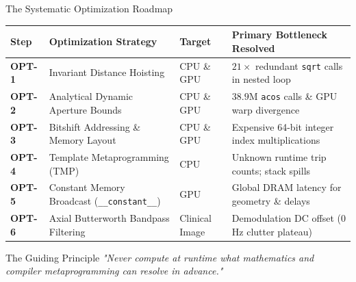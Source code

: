 \documentclass[aspectratio=169,10pt]{beamer}
\begin{document}
\begin{frame}{The Systematic Optimization Roadmap}
  \begin{table}
    \centering
    \tiny
    \begin{tabular}{@{}llll@{}}
      \toprule
      \textbf{Step} & \textbf{Optimization Strategy} & \textbf{Target} & \textbf{Primary Bottleneck Resolved} \\
      \midrule
      \textbf{OPT-1} & Invariant Distance Hoisting & CPU \& GPU & $21\times$ redundant \texttt{sqrt} calls in nested loop \\
      \textbf{OPT-2} & Analytical Dynamic Aperture Bounds & CPU \& GPU & $38.9\text{M}$ \texttt{acos} calls \& GPU warp divergence \\
      \textbf{OPT-3} & Bitshift Addressing \& Memory Layout & CPU \& GPU & Expensive 64-bit integer index multiplications \\
      \textbf{OPT-4} & Template Metaprogramming (TMP) & CPU & Unknown runtime trip counts; stack spills \\
      \textbf{OPT-5} & Constant Memory Broadcast (\texttt{\_\_constant\_\_}) & GPU & Global DRAM latency for geometry \& delays \\
      \textbf{OPT-6} & Axial Butterworth Bandpass Filtering & Clinical Image & Demodulation DC offset ($0$ Hz clutter plateau) \\
      \bottomrule
    \end{tabular}
  \end{table}
  \vspace{0.2cm}
  \begin{block}{The Guiding Principle}
    \small \textit{"Never compute at runtime what mathematics and compiler metaprogramming can resolve in advance."}
  \end{block}
\end{frame}
\end{document}
